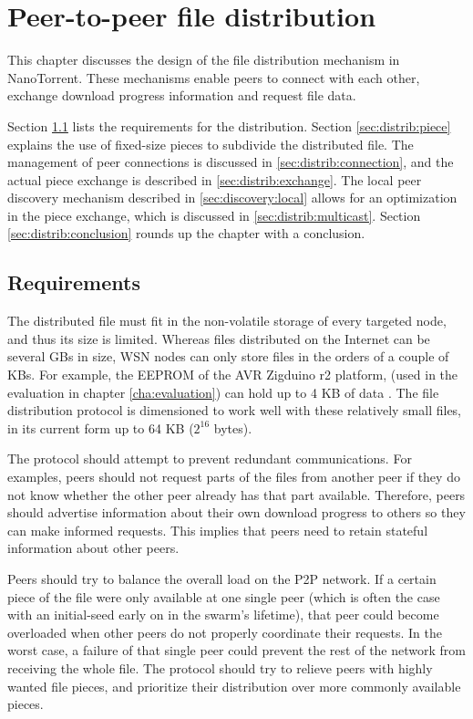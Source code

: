 \chapter{Peer-to-peer file distribution}
\label{cha:distribution}
This chapter discusses the design of the file distribution mechanism in NanoTorrent. These mechanisms enable peers to connect with each other, exchange download progress information and request file data.

Section \ref{sec:distrib:requirements} lists the requirements for the distribution. Section \ref{sec:distrib:piece} explains the use of fixed-size pieces to subdivide the distributed file. The management of peer connections is discussed in \ref{sec:distrib:connection}, and the actual piece exchange is described in \ref{sec:distrib:exchange}. The local peer discovery mechanism described in \ref{sec:discovery:local} allows for an optimization in the piece exchange, which is discussed in \ref{sec:distrib:multicast}. Section \ref{sec:distrib:conclusion} rounds up the chapter with a conclusion.

\section{Requirements}
\label{sec:distrib:requirements}
The distributed file must fit in the non-volatile storage of every targeted node, and thus its size is limited. Whereas files distributed on the Internet can be several \glspl{GB} in size, \gls{WSN} nodes can only store files in the orders of a couple of \glspl{KB}. For example, the \gls{EEPROM} of the AVR Zigduino r2 platform, (used in the evaluation in chapter \ref{cha:evaluation}) can hold up to 4 KB of data \cite{zigduino-manual}. The file distribution protocol is dimensioned to work well with these relatively small files, in its current form up to 64 \gls{KB} ($2^{16}$ bytes).

The protocol should attempt to prevent redundant communications. For examples, peers should not request parts of the files from another peer if they do not know whether the other peer already has that part available. Therefore, peers should advertise information about their own download progress to others so they can make informed requests. This implies that peers need to retain stateful information about other peers.

Peers should try to balance the overall load on the \gls{P2P} network. If a certain piece of the file were only available at one single peer (which is often the case with an \gls{initial-seed} early on in the \gls{swarm}'s lifetime), that peer could become overloaded when other peers do not properly coordinate their requests. In the worst case, a failure of that single peer could prevent the rest of the network from receiving the whole file. The protocol should try to relieve peers with highly wanted file pieces, and prioritize their distribution over more commonly available pieces.

